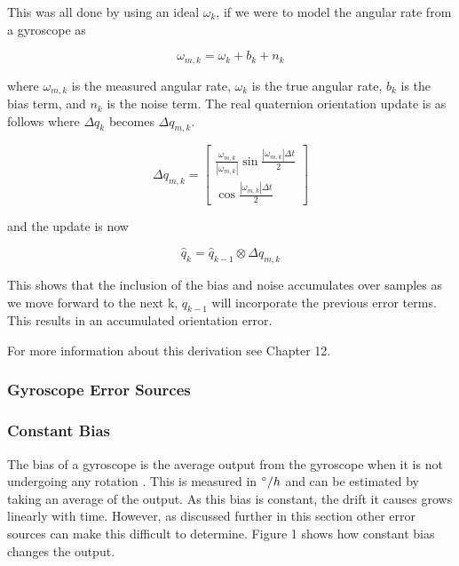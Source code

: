 This was all done by using an ideal $\omega_k$, if we were to model the angular
rate from a gyroscope as \cite{trawny_2005_indirect}

\begin{equation}
\omega_{m,k} = \omega_k + b_k + n_k 
\end{equation}

where $\omega_{m,k}$ is the measured angular rate, $\omega_k$ is the true angular rate,
$b_k$ is the bias term, and $n_k$ is the noise term. The real quaternion orientation
update is as follows where $\Delta q_k$ becomes $\Delta q_{m,k}$.

\begin{equation}
\Delta q_{m,k} = \begin{bmatrix}
    \frac{\omega_{m,k}}{|\omega_{m,k}|} \sin{\frac{|\omega_{m,k}| \Delta t}{2}} \\
    \cos{\frac{|\omega_{m,k}| \Delta t}{2}}
    \end{bmatrix}
\end{equation}

and the update is now

\begin{equation}
\hat{q}_k = \hat{q}_{k-1} \otimes \Delta q_{m,k}
\end{equation}

This shows that the inclusion of the bias and noise accumulates over samples
as we move forward to the next k, $q_{k-1}$ will incorporate the previous error
terms. This results in an accumulated orientation error.

For more information about this derivation see Chapter 12\cite{yang_2014_body}.






\subsubsection{Gyroscope Error Sources}
\label{sec:gyroerrors}
\subsubsection*{Constant Bias}
The bias of a gyroscope is the average output from the gyroscope when it is not undergoing any
rotation \cite{woodman_2007_number}. This is measured in $ \degree /h$ and can be estimated by taking an average
of the output. As this bias is constant, the drift it causes grows linearly with time. 
However, as discussed further in this section other error sources can make this
difficult to determine. Figure 1 shows how constant bias changes the output.

